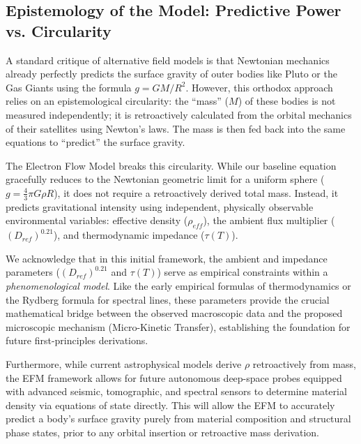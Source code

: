 \documentclass[11pt, a4paper]{article}
\begin{document}
\subsection{Epistemology of the Model: Predictive Power vs. Circularity}
A standard critique of alternative field models is that Newtonian mechanics already perfectly predicts the surface gravity of outer bodies like Pluto or the Gas Giants using the formula $g = GM/R^2$. However, this orthodox approach relies on an epistemological circularity: the ``mass'' ($M$) of these bodies is not measured independently; it is retroactively calculated from the orbital mechanics of their satellites using Newton's laws. The mass is then fed back into the same equations to ``predict'' the surface gravity. 

The Electron Flow Model breaks this circularity. While our baseline equation gracefully reduces to the Newtonian geometric limit for a uniform sphere ($g = \frac{4}{3}\pi G \rho R$), it does not require a retroactively derived total mass. Instead, it predicts gravitational intensity using independent, physically observable environmental variables: effective density ($\rho_{eff}$), the ambient flux multiplier ($(D_{ref})^{0.21}$), and thermodynamic impedance ($\tau(T)$). 

We acknowledge that in this initial framework, the ambient and impedance parameters ($(D_{ref})^{0.21}$ and $\tau(T)$) serve as empirical constraints within a \textit{phenomenological model}. Like the early empirical formulas of thermodynamics or the Rydberg formula for spectral lines, these parameters provide the crucial mathematical bridge between the observed macroscopic data and the proposed microscopic mechanism (Micro-Kinetic Transfer), establishing the foundation for future first-principles derivations.

Furthermore, while current astrophysical models derive $\rho$ retroactively from mass, the EFM framework allows for future autonomous deep-space probes equipped with advanced seismic, tomographic, and spectral sensors to determine material density via equations of state directly. This will allow the EFM to accurately predict a body's surface gravity purely from material composition and structural phase states, prior to any orbital insertion or retroactive mass derivation.

\clearpage
\end{document}
